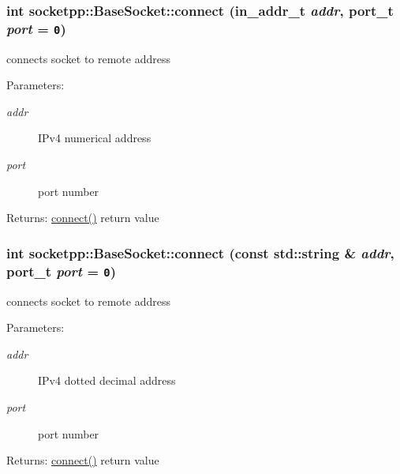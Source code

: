 \begin{CompactItemize}
{\subsubsection[{connect}]{\setlength{\rightskip}{0pt plus 5cm}int socketpp::BaseSocket::connect (in\_\-addr\_\-t {\em addr}, \/  port\_\-t {\em port} = {\tt 0})}}
\label{classsocketpp_1_1BaseSocket_2bdd6d459e6f9cf2f71636b01787b250}


connects socket to remote address 

\begin{Desc}
\item[Parameters:]
\begin{description}
\item[{\em addr}]IPv4 numerical address \item[{\em port}]port number \end{description}
\end{Desc}
\begin{Desc}
\item[Returns:]\hyperlink{classsocketpp_1_1BaseSocket_769710192256606aaec1a776468d75fa}{connect()} return value \end{Desc}
\hypertarget{classsocketpp_1_1BaseSocket_769710192256606aaec1a776468d75fa}{
\subsubsection[{connect}]{\setlength{\rightskip}{0pt plus 5cm}int socketpp::BaseSocket::connect (const std::string \& {\em addr}, \/  port\_\-t {\em port} = {\tt 0})}}
\label{classsocketpp_1_1BaseSocket_769710192256606aaec1a776468d75fa}


connects socket to remote address 

\begin{Desc}
\item[Parameters:]
\begin{description}
\item[{\em addr}]IPv4 dotted decimal address \item[{\em port}]port number \end{description}
\end{Desc}
\begin{Desc}
\item[Returns:]\hyperlink{classsocketpp_1_1BaseSocket_769710192256606aaec1a776468d75fa}{connect()} return value \end{Desc}
\hypertarget{classsocketpp_1_1BaseSocket_c96db07cc917926d895d89cf73734ea1}{
}
\end{CompactItemize}
